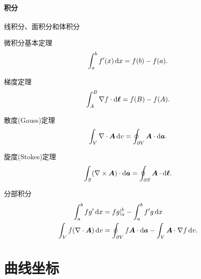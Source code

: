 \paragraph{积分}
\begin{compactitem}
	\item 线积分、面积分和体积分
	\item 微积分基本定理
	\[
        \int_a^b f'(x)\mathop{}\!\mathrm{d} x=f(b)-f(a).
    \]
    \item 梯度定理
    \begin{align}
        \int_A^B\nabla f\cdot\mathop{}\!\mathrm{d}\bm\ell=f(B)-f(A).
    \end{align}
    \item 散度(Gauss)定理
    \begin{align}\label{eqn:div}
        \int_V\nabla\cdot\bm A\mathop{}\!\mathrm{d} v=\oint_{\partial V}\bm A\cdot\mathop{}\!\mathrm{d}\bm a.
    \end{align}
    \item 旋度(Stokes)定理
    \begin{align}\label{eqn:curl}
        \int_S(\nabla\times\bm A)\cdot\mathop{}\!\mathrm{d}\bm a=\oint_{\partial S}\bm A\cdot\mathop{}\!\mathrm{d}\bm\ell.
    \end{align}
    \item 分部积分
    \begin{align}\notag
        \int_a^bfg'\mathop{}\!\mathrm{d} x&=fg|_a^b-\int_a^bf'g\mathop{}\!\mathrm{d} x\\
        \int_Vf(\nabla\cdot\bm A)\mathop{}\!\mathrm{d} v&=\oint_{\partial V}f\bm A\cdot\mathop{}\!\mathrm{d}\bm a-\int_V\bm A\cdot\nabla f\mathop{}\!\mathrm{d} v.
    \end{align}
\end{compactitem}
\section{曲线坐标}
